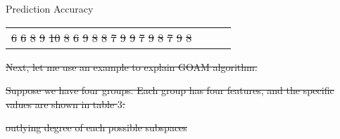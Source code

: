 \documentclass[
 size=14pt,
 paper=smartboard,  %
 mode=present, 		%
 display=slides, 	%
 style=tuliplab,  	%
 pauseslide,
 fleqn,leqno]{powerdot}
\providecommand{\DIFdeltex}[1]{{\protect\color{red}\sout{#1}}}                      %
\providecommand{\DIFdelbegin}{} %
\providecommand{\DIFdelend}{} %
\providecommand{\DIFdelFL}[1]{\DIFdel{#1}} %
\providecommand{\DIFdelendFL}{} %
\providecommand{\DIFdel}[1]{\texorpdfstring{\DIFdeltex{#1}}{}} %
\newcommand{\DIFscaledelfig}{0.5}
\newlength{\DIFdelgraphicswidth} %
\newlength{\DIFdelgraphicsheight} %
\newcommand{\DIFdelincludegraphics}[2][]{%
\sbox{\DIFdelgraphicsbox}{\DIFOincludegraphics[#1]{#2}}%
\settoboxwidth{\DIFdelgraphicswidth}{\DIFdelgraphicsbox} %
\settoboxtotalheight{\DIFdelgraphicsheight}{\DIFdelgraphicsbox} %
\scalebox{\DIFscaledelfig}{%
\parbox[b]{\DIFdelgraphicswidth}{\usebox{\DIFdelgraphicsbox}\\[-\baselineskip] \rule{\DIFdelgraphicswidth}{0em}}\llap{\resizebox{\DIFdelgraphicswidth}{\DIFdelgraphicsheight}{%
\setlength{\unitlength}{\DIFdelgraphicswidth}%
\begin{picture}(1,1)%
\thicklines\linethickness{2pt} %
{\color[rgb]{1,0,0}\put(0,0){\framebox(1,1){}}}%
{\color[rgb]{1,0,0}\put(0,0){\line( 1,1){1}}}%
{\color[rgb]{1,0,0}\put(0,1){\line(1,-1){1}}}%
\end{picture}%
}\hspace*{3pt}}} %
} %
\DeclareRobustCommand{\DIFdelbegin}{\DIFOdelbegin \let\includegraphics\DIFdelincludegraphics} %
\DeclareRobustCommand{\DIFdelend}{\DIFOaddend \let\includegraphics\DIFOincludegraphics} %
\DeclareRobustCommand{\DIFdelendFL}{\DIFOaddendFL \let\includegraphics\DIFOincludegraphics} %
\begin{document}
\begin{slide}{Prediction Accuracy}
\begin{table}
\begin{tabular}{cccc}
\DIFdelFL{6 }%
\DIFdelFL{6 }%
\DIFdelFL{8}%
\DIFdelFL{9 }%
\DIFdelFL{10 }%
\DIFdelFL{8 }%
\DIFdelFL{6 }%
\DIFdelFL{9 }%
\DIFdelFL{8 }%
\DIFdelFL{8 }%
\DIFdelFL{7}%
\DIFdelFL{9 }%
\DIFdelFL{9  }%
\DIFdelFL{7 }%
\DIFdelFL{9 }%
\DIFdelFL{8 }%
\DIFdelFL{7 }%
\DIFdelFL{9 }%
\DIFdelFL{8}%
\DIFdelendFL \bottomrule
\end{tabular}
\end{table}

\DIFdelbegin %
\DIFdel{Next,
let me use an example to explain GOAM algorithm.
}%

\DIFdel{Suppose we have four groups.
Each group has four features,
and
the specific values are shown in table $3$.
}%

\DIFdelend \end{slide}

\DIFdelbegin %
\DIFdelend %



\DIFdelbegin %
{%
\DIFdelFL{outlying degree of each possible subspaces}}
\DIFdelendFL %
\end{document}
